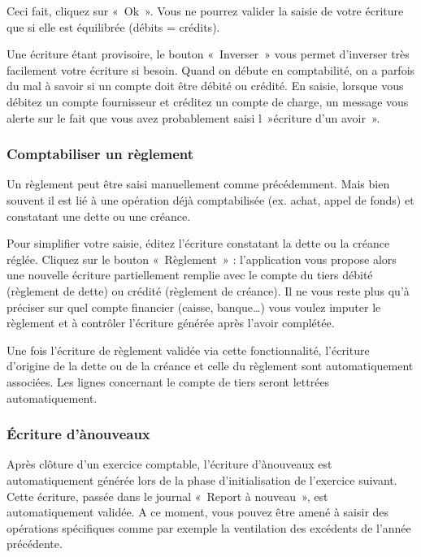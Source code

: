 \documentclass[a4paper,10pt,oneside,french]{sphinxmanual}
\begin{document}
\sphinxAtStartPar
Ceci fait, cliquez sur « Ok ». Vous ne pourrez valider la saisie de votre écriture que si elle est équilibrée (débits = crédits).

\sphinxAtStartPar
{}

\sphinxAtStartPar
Une écriture étant provisoire, le bouton « Inverser » vous permet d’inverser très facilement votre écriture si besoin.
Quand on débute en comptabilité, on a parfois du mal à savoir si un compte doit être débité ou crédité.
En saisie, lorsque vous débitez un compte fournisseur et créditez un compte de charge, un message vous alerte sur le fait que vous avez probablement saisi l »écriture d’un avoir ».


\subsubsection{Comptabiliser un règlement}
\label{\detokenize{accounting/entity:comptabiliser-un-reglement}}
\sphinxAtStartPar
Un règlement peut être saisi manuellement comme précédemment. Mais bien souvent il est lié à une opération déjà comptabilisée  (ex. achat, appel de fonds) et constatant une dette ou une créance.

\sphinxAtStartPar
Pour simplifier votre saisie, éditez l’écriture constatant la dette ou la créance réglée. Cliquez sur le bouton « Règlement » : l’application vous propose alors une nouvelle écriture partiellement remplie avec le compte du tiers débité (règlement de dette) ou crédité (règlement de créance).
Il ne vous reste plus qu’à préciser sur quel compte financier (caisse, banque…) vous voulez imputer le règlement et à contrôler l’écriture générée après l’avoir complétée.

\sphinxAtStartPar
Une fois l’écriture de règlement validée via cette fonctionnalité, l’écriture d’origine de la dette ou de la créance et celle du règlement sont automatiquement associées. Les lignes concernant le compte de tiers seront lettrées automatiquement.


\subsubsection{Écriture d’à\sphinxhyphen{}nouveaux}
\label{\detokenize{accounting/entity:ecriture-d-a-nouveaux}}
\sphinxAtStartPar
Après clôture d’un exercice comptable, l’écriture d’à\sphinxhyphen{}nouveaux est automatiquement générée lors de la phase d’initialisation de l’exercice suivant. Cette écriture, passée dans le journal « Report à nouveau », est automatiquement validée.
A ce moment, vous pouvez être amené à saisir des opérations spécifiques comme par exemple la ventilation des excédents de l’année précédente.
\end{document}
